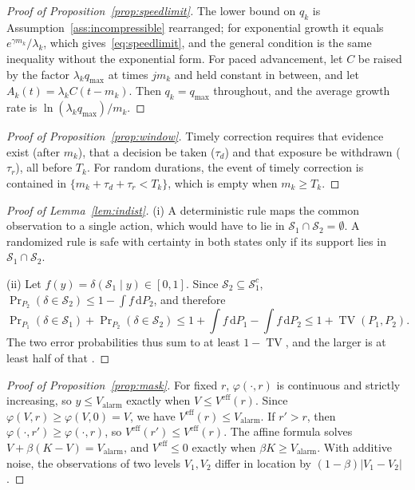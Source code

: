 \documentclass[11pt]{article}
\theoremstyle{plain}
\theoremstyle{definition}
\newcommand{\Valarm}{V_{\mathrm{alarm}}}
\newcommand{\Veff}{V^{\mathrm{eff}}}
\newcommand{\qmax}{q_{\max}}
\newcommand{\dd}{\mathrm{d}}
\newcommand{\TV}{\operatorname{TV}}
\begin{document}
\begin{proof}[Proof of Proposition~\ref{prop:speedlimit}]
The lower bound on $q_k$ is Assumption~\ref{ass:incompressible} rearranged; for exponential growth it equals $e^{\gamma m_k}/\lambda_k$, which gives~\eqref{eq:speedlimit}, and the general condition is the same inequality without the exponential form. For paced advancement, let $C$ be raised by the factor $\lambda_k\qmax$ at times $jm_k$ and held constant in between, and let $A_k(t)=\lambda_kC(t-m_k)$. Then $q_k=\qmax$ throughout, and the average growth rate is $\ln(\lambda_k\qmax)/m_k$.
\end{proof}

\begin{proof}[Proof of Proposition~\ref{prop:window}]
Timely correction requires that evidence exist (after $m_k$), that a decision be taken ($\tau_d$) and that exposure be withdrawn ($\tau_r$), all before $T_k$. For random durations, the event of timely correction is contained in $\{m_k+\tau_d+\tau_r<T_k\}$, which is empty when $m_k\ge T_k$.
\end{proof}

\begin{proof}[Proof of Lemma~\ref{lem:indist}]
(i) A deterministic rule maps the common observation to a single action, which would have to lie in $\mathcal{S}_1\cap \mathcal{S}_2=\emptyset$. A randomized rule is safe with certainty in both states only if its support lies in $\mathcal{S}_1\cap \mathcal{S}_2$.

(ii) Let $f(y)=\delta(\mathcal{S}_1\mid y)\in[0,1]$. Since $\mathcal{S}_2\subseteq \mathcal{S}_1^{c}$, $\Pr_{P_2}(\delta\in \mathcal{S}_2)\le1-\int f\,\dd P_2$, and therefore
\[
\Pr\nolimits_{P_1}(\delta\in \mathcal{S}_1)+\Pr\nolimits_{P_2}(\delta\in \mathcal{S}_2)\le1+\int f\,\dd P_1-\int f\,\dd P_2\le1+\TV(P_1,P_2).
\]
The two error probabilities thus sum to at least $1-\TV$, and the larger is at least half of that \citep{lecam1973,tsybakov2009}.
\end{proof}

\begin{proof}[Proof of Proposition~\ref{prop:mask}]
For fixed $r$, $\varphi(\cdot,r)$ is continuous and strictly increasing, so $y\le\Valarm$ exactly when $V\le\Veff(r)$. Since $\varphi(V,r)\ge\varphi(V,0)=V$, we have $\Veff(r)\le\Valarm$. If $r'>r$, then $\varphi(\cdot,r')\ge\varphi(\cdot,r)$, so $\Veff(r')\le\Veff(r)$. The affine formula solves $V+\beta(K-V)=\Valarm$, and $\Veff\le0$ exactly when $\beta K\ge\Valarm$. With additive noise, the observations of two levels $V_1,V_2$ differ in location by $(1-\beta)|V_1-V_2|$.
\end{proof}
\end{document}
